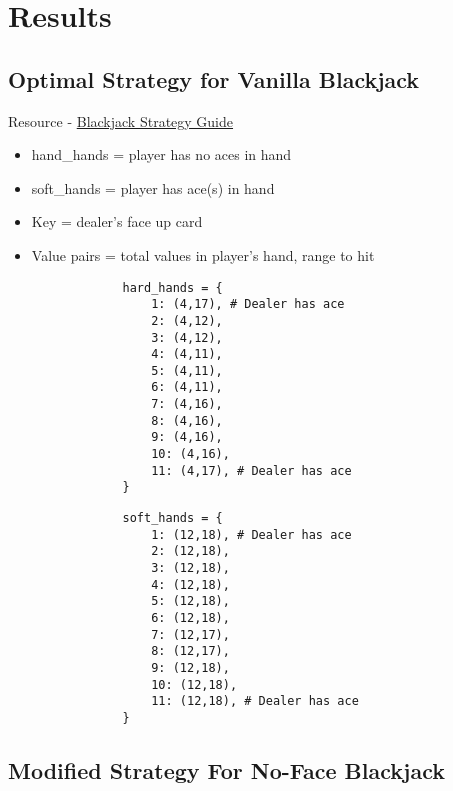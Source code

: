 \documentclass{article}
\begin{document}
\section{Results}
\label{sec: Results}

        \subsection{Optimal Strategy for Vanilla Blackjack}
	\label{Optimal Strategy for Vanilla Blackjack}

        Resource - \href{https://www.kjartan.co.uk/games/pix/cards/Blackjack%20full%20guide.pdf}{Blackjack Strategy Guide}

        \begin{itemize}
            \item hand\_hands = player has no aces in hand
            \item soft\_hands = player has ace(s) in hand
            \item Key = dealer's face up card
            \item Value pairs = total values in player's hand, range to hit
        \end{itemize}

        \begin{verbatim}
                hard_hands = {
                    1: (4,17), # Dealer has ace
                    2: (4,12),
                    3: (4,12),
                    4: (4,11),
                    5: (4,11),
                    6: (4,11),
                    7: (4,16),
                    8: (4,16),
                    9: (4,16),
                    10: (4,16),
                    11: (4,17), # Dealer has ace
                }
        \end{verbatim}

        \begin{verbatim}
                soft_hands = {
                    1: (12,18), # Dealer has ace
                    2: (12,18), 
                    3: (12,18), 
                    4: (12,18), 
                    5: (12,18), 
                    6: (12,18), 
                    7: (12,17), 
                    8: (12,17), 
                    9: (12,18), 
                    10: (12,18), 
                    11: (12,18), # Dealer has ace
                }
        \end{verbatim}

        \subsection{Modified Strategy For No-Face Blackjack}
	\label{Modified Strategy For No-Face Blackjack}
\end{document}
